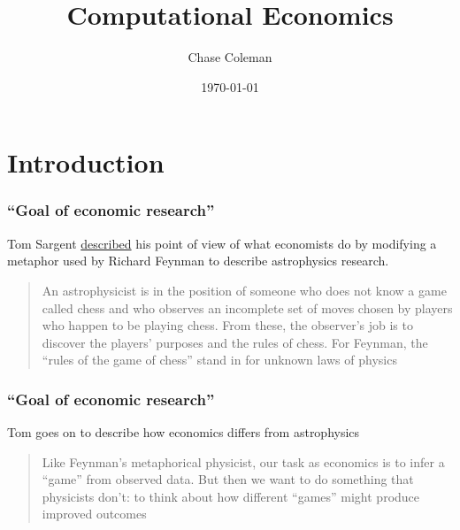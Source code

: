 \documentclass[10pt]{beamer}
\title{Computational Economics}
\author{Chase Coleman}
\institute{Rice}
\date[]{\today}
\begin{document}
\begin{frame}
  \thispagestyle{empty}
  \titlepage
\end{frame}


\section{Introduction}

  \begin{frame} \frametitle{``Goal of economic research''}
  
    Tom Sargent \href{http://www.tomsargent.com/personal/dinner_speech_2015.pdf}{described} his point
    of view of what economists do by modifying a metaphor used by Richard Feynman to describe
    astrophysics research.
  
    \vspace{0.5cm}
  
    \begin{quote}
      An astrophysicist is in the position of someone who does not know a game called chess and who
      observes an incomplete set of moves chosen by players who happen to be playing chess. From
      these, the observer's job is to discover the players' purposes and the rules of chess. For
      Feynman, the ``rules of the game of chess'' stand in for unknown laws of physics
    \end{quote}
  
  \end{frame}
  
  
  \begin{frame} \frametitle{``Goal of economic research''}
  
    Tom goes on to describe how economics differs from astrophysics
  
    \vspace{0.5cm}
  
    \begin{quote}
      Like Feynman's metaphorical physicist, our task as economics is to infer a ``game'' from
      observed data. But then we want to do something that physicists don't: to think about how
      different ``games'' might produce improved outcomes
    \end{quote}
  
  \end{frame}
  
\end{document}

